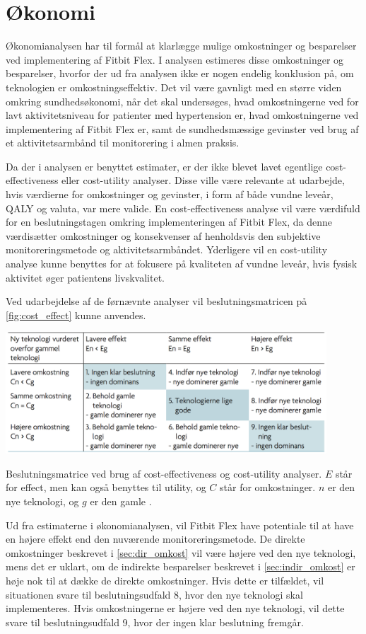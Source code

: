 \section{Økonomi} \label{sec:dis_oekonomi}
Økonomianalysen har til formål at klarlægge mulige omkostninger og besparelser ved implementering af Fitbit Flex. I analysen estimeres disse omkostninger og besparelser, hvorfor der ud fra analysen ikke er nogen endelig konklusion på, om teknologien er omkostningseffektiv. Det vil være gavnligt med en større viden omkring sundhedsøkonomi, når det skal undersøges, hvad omkostningerne ved for lavt aktivitetsniveau for patienter med hypertension er, hvad omkostningerne ved implementering af Fitbit Flex er, samt de sundhedsmæssige gevinster ved brug af et aktivitetsarmbånd til monitorering i almen praksis. 

Da der i analysen er benyttet estimater, er der ikke blevet lavet egentlige cost-effectiveness eller cost-utility analyser. Disse ville være relevante at udarbejde, hvis værdierne for omkostninger og gevinster, i form af både vundne leveår, QALY og valuta, var mere valide. En cost-effectiveness analyse vil være værdifuld for en beslutningstagen omkring implementeringen af Fitbit Flex, da denne værdisætter omkostninger og konsekvenser af henholdsvis den subjektive monitoreringsmetode og aktivitetsarmbåndet. Yderligere vil en cost-utility analyse kunne benyttes for at fokusere på kvaliteten af vundne leveår, hvis fysisk aktivitet øger patientens livskvalitet.

Ved udarbejdelse af de førnævnte analyser vil beslutningsmatricen på \autoref{fig:cost_effect} kunne anvendes. 

\begin{table}[H]
	\centering
	\includegraphics[width=0.9\textwidth]{figures/cost-effectiveness}
	\caption{Beslutningsmatrice ved brug af cost-effectiveness og cost-utility analyser. $E$ står for effect, men kan også benyttes til utility, og $C$ står for omkostninger. $n$ er den nye teknologi, og $g$ er den gamle \citep{mtvhaandbog}.}
	\label{fig:cost_effect}
\end{table}

\noindent
Ud fra estimaterne i økonomianalysen, vil Fitbit Flex have potentiale til at have en højere effekt end den nuværende monitoreringsmetode. De direkte omkostninger beskrevet i \autoref{sec:dir_omkost} vil være højere ved den nye teknologi, mens det er uklart, om de indirekte besparelser beskrevet i \autoref{sec:indir_omkost} er høje nok til at dække de direkte omkostninger. Hvis dette er tilfældet, vil situationen svare til beslutningsudfald 8, hvor den nye teknologi skal implementeres. Hvis omkostningerne er højere ved den nye teknologi, vil dette svare til beslutningsudfald 9, hvor der ingen klar beslutning fremgår. 